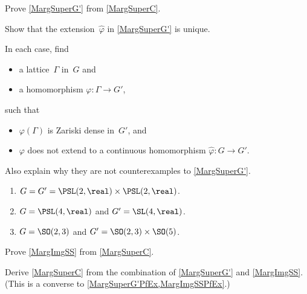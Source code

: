\begin{exercises}
\item \label{MargSuperG'PfEx}
Prove \cref{MargSuperG'} from \cref{MargSuperC}.

\item %
Show that the extension~$\widehat\varphi$ in \cref{MargSuperG'} is unique.

\item \label{MargSuperG'NeedEx}
In each case, find
	\begin{itemize}
	\item a lattice~$\Gamma$ in~$G$
	and
	\item a homomorphism $\varphi \colon \Gamma \to G'$,
	\end{itemize}
such that 
	\begin{itemize}
	\item $\varphi(\Gamma)$ is Zariski dense in~$G'$,
	and
	\item $\varphi$ does not extend to a continuous homomorphism $\widehat\varphi \colon G \to G'$.
	\end{itemize}
Also explain why they are not counterexamples to \cref{MargSuperG'}.
	\begin{enumerate}
	\item $G = G' =  \PSL(2,\real) \times \PSL(2,\real)$.
	\item $G = \PSL(4,\real)$ and $G' = \SL(4,\real)$.
	\item $G = \SO(2,3)$ and $G' = \SO(2,3) \times \SO(5)$.
	\end{enumerate}

\item \label{MargImgSSPfEx}
Prove \cref{MargImgSS} from \cref{MargSuperC}.

\item \label{MargSuperFromG'PfEx}
Derive \cref{MargSuperC} from the combination of \cref{MargSuperG'} and \cref{MargImgSS}. (This is a converse to \cref{MargSuperG'PfEx,MargImgSSPfEx}.)



\end{exercises}

